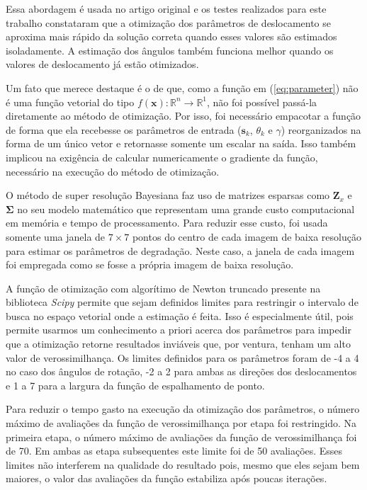 Essa abordagem é usada no artigo original e os testes realizados para este trabalho
constataram que a otimização dos parâmetros de deslocamento se aproxima mais rápido da
solução correta quando esses valores são estimados isoladamente.
A estimação dos ângulos também funciona melhor quando os valores de deslocamento já estão
otimizados.


Um fato que merece destaque é o de que, como a função em (\ref{eq:parameter}) não é uma
função vetorial do tipo $ f(\mathbf{x}) : \mathbb{R}^n \to \mathbb{R}^1 $, não foi 
possível passá-la diretamente ao método de otimização.
Por isso, foi necessário empacotar a função de forma que ela recebesse os parâmetros de
entrada ($\mathbf{s}_k$, $\theta_k$ e $\gamma$) reorganizados na forma de um único
vetor e retornasse somente um escalar na saída.
Isso também implicou na exigência de calcular numericamente o gradiente da função,
necessário na execução do método de otimização.

O método de super resolução Bayesiana faz uso de matrizes esparsas como $\mathbf{Z}_x$ e $\mathbf{\Sigma}$ no seu modelo matemático que representam uma grande custo computacional em memória e tempo de processamento.
Para reduzir esse custo, foi usada somente uma janela de $7 \times 7$ pontos do centro de
cada imagem de baixa resolução para estimar os parâmetros de degradação.
Neste caso, a janela de cada imagem foi empregada como se fosse a própria
imagem de baixa resolução.

A função de otimização com algorítimo de Newton truncado presente na biblioteca
\emph{Scipy} permite que sejam definidos limites para restringir o intervalo de busca
no espaço vetorial onde a estimação é feita.
Isso é especialmente útil, pois permite usarmos um conhecimento a priori acerca dos
parâmetros para impedir que a otimização retorne resultados inviáveis que, por ventura,
tenham um alto valor de verossimilhança.
Os limites definidos para os parâmetros foram de -4 a 4 no caso dos ângulos de rotação,
-2 a 2 para ambas as direções dos deslocamentos e 1 a 7 para a largura da função de
espalhamento de ponto.

Para reduzir o tempo gasto na execução da otimização dos parâmetros, o número máximo de avaliações da função de verossimilhança por etapa foi restringido.
Na primeira etapa, o número máximo de avaliações da função de verossimilhança foi de 70.
Em ambas as etapa subsequentes este limite foi de 50 avaliações.
Esses limites não interferem na qualidade do resultado pois, mesmo que eles sejam bem maiores, o valor das avaliações da função estabiliza após poucas iterações.


